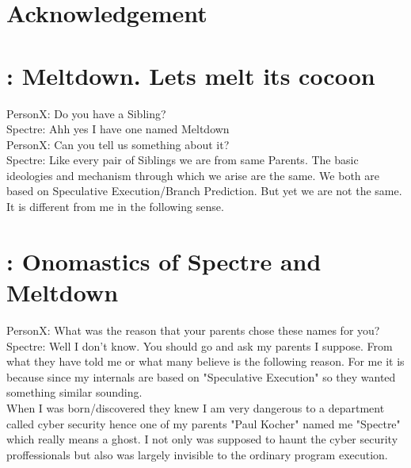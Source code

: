 \documentclass[12pt]{article}
\begin{document}
\section{Acknowledgement}
\newpage


\newpage
\begin{appendices}	
	\section{: Meltdown. Lets melt its cocoon}
	
	PersonX: Do you have a Sibling?\\
	
	Spectre: Ahh yes I have one named Meltdown\\
		
	PersonX: Can you tell us something about it?\\
	
	Spectre: Like every pair of Siblings we are from same Parents. The basic ideologies and mechanism through which we arise are the same. We both are based on Speculative Execution/Branch Prediction. But yet we are not the same. It is different from me in the following sense.
	
	\section{:  Onomastics of Spectre and Meltdown}
	
	PersonX: What was the reason that your parents chose these names for you?\\
	
	Spectre: Well I don't know. You should go and ask my parents I suppose. From what they have told me or what many believe is the following reason. For me it is because since my internals are based on "Speculative Execution"  so they wanted something similar sounding.\\ When I was born/discovered they knew I am very dangerous to a department called cyber security hence one of my parents "Paul Kocher" named me "Spectre" which really means a ghost. I not only was supposed to haunt the cyber security proffessionals but also was largely invisible to the ordinary program execution.\\
	

\end{appendices}
\end{document}
